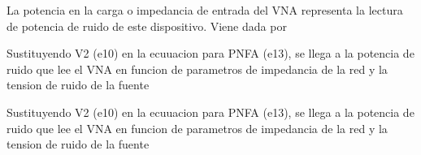 \documentclass{article}
\begin{document}
\begin{maplegroup}
\mapleresult
\begin{maplelatex}
\end{maplelatex}
\end{maplegroup}
\begin{Maple Normal}{
\begin{Maple Normal}{
La potencia en la carga o impedancia de entrada del VNA representa la lectura de potencia de ruido de este dispositivo. Viene dada por}\end{Maple Normal}

}\end{Maple Normal}

\begin{maplegroup}
\mapleresult
\begin{maplelatex}
\end{maplelatex}
\end{maplegroup}
\begin{Maple Normal}{
\begin{Maple Normal}{
Sustituyendo V2 (e10) en la ecuuacion para PNFA (e13), se llega a la potencia de ruido que lee el VNA en funcion de parametros de impedancia de la red y la tension de ruido de la fuente}\end{Maple Normal}

\begin{Maple Normal}{
Sustituyendo V2 (e10) en la ecuuacion para PNFA (e13), se llega a la potencia de ruido que lee el VNA en funcion de parametros de impedancia de la red y la tension de ruido de la fuente}\end{Maple Normal}

}\end{Maple Normal}
\end{document}
